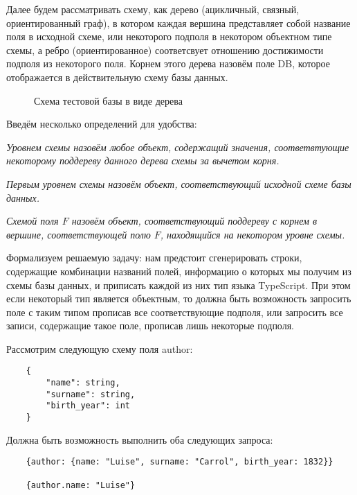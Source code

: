 \documentclass[12pt]{article}
\begin{document}

    Далее будем рассматривать схему, как дерево (ацикличный, связный, ориентированный граф), в котором каждая вершина представляет собой название
    поля в исходной схеме, или некоторого подполя в некотором объектном типе схемы, а ребро (ориентированное) соответсвует отношению достижимости
    подполя из некоторого поля. Корнем этого дерева назовём поле DB, которое отображается в действительную схему базы данных.

    \begin{figure}[h]
        \caption{Схема тестовой базы в виде дерева}
    \end{figure}

    Введём несколько определений для удобства:
    \begin{definition}
        \it{Уровнем схемы} назовём любое объект, содержащий значения, соответвтующие некоторому поддереву данного дерева схемы за вычетом корня.
    \end{definition}
    \begin{definition}
        \it{Первым уровнем схемы} назовём объект, соответствующий исходной схеме базы данных.
    \end{definition}
    \begin{definition}
        \it{Схемой поля} $F$ назовём объект, соответствующий поддереву с корнем в вершине, соответствующей полю $F$, находящийся на некотором уровне схемы.
    \end{definition}

    Формализуем решаемую задачу: нам предстоит сгенерировать строки, содержащие комбинации названий полей, информацию о которых мы получим из
    схемы базы данных, и приписать каждой из них тип языка TypeScript. При этом если некоторый тип является объектным, то должна быть возможность
    запросить поле с таким типом прописав все соответствующие подполя, или запросить все записи, содержащие такое поле, прописав лишь некоторые подполя.
    \begin{example}
        Рассмотрим следующую схему поля author:
        \begin{lstlisting}
    {
        "name": string,
        "surname": string,
        "birth_year": int
    }
        \end{lstlisting}
        Должна быть возможность выполнить оба следующих запроса:
        \begin{lstlisting}
    {author: {name: "Luise", surname: "Carrol", birth_year: 1832}}

    {author.name: "Luise"}
        \end{lstlisting}
    \end{example}
\end{document}
